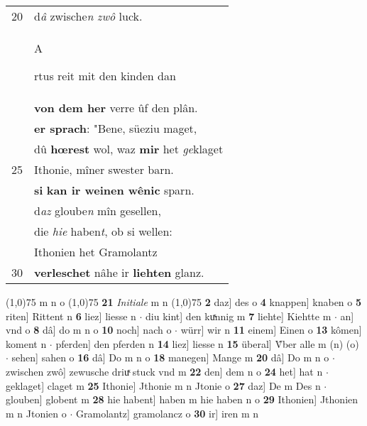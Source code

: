 \documentclass[8pt,a4paper,notitlepage]{article}
\begin{document}
\begin{table}[ht]
\begin{minipage}[t]{0.5\linewidth}
\begin{tabular}{rl}
20 & d\textit{â} zwische\textit{n} \textit{zwô} luck.\\ 
 & \begin{large}A\end{large}rtus reit mit den kinden dan\\ 
 & \textbf{von dem her} verre ûf den plân.\\ 
 & \textbf{er sprach}: "Bene, süeziu maget,\\ 
 & dû \textbf{hœrest} wol, waz \textbf{mir} het \textit{ge}klaget\\ 
25 & Ithonie, mîner swester barn.\\ 
 & \textbf{si} \textbf{kan ir weinen wênic} sparn.\\ 
 & d\textit{az} gloube\textit{n} mîn gesellen,\\ 
 & die \textit{hie} haben\textit{t}, ob si wellen:\\ 
 & Ithonien het Gramolantz\\ 
30 & \textbf{verleschet} nâhe ir \textbf{liehten} glanz.\\ 
\end{tabular}
\scriptsize
\line(1,0){75} \newline
m n o \newline
\line(1,0){75} \newline
\textbf{21} \textit{Initiale} m n  \newline
\line(1,0){75} \newline
\textbf{2} daz] des o \textbf{4} knappen] knaben o \textbf{5} riten] Rittent n \textbf{6} liez] liesse n  $\cdot$ diu kint] den kuͯnnig m \textbf{7} liehte] Kiehtte m  $\cdot$ an] vnd o \textbf{8} dâ] do m n o \textbf{10} noch] nach o  $\cdot$ würr] wir n \textbf{11} einem] Einen o \textbf{13} kômen] koment n  $\cdot$ pferden] den pferden n \textbf{14} liez] liesse n \textbf{15} überal] V̂ber alle m (n) (o)  $\cdot$ sehen] sahen o \textbf{16} dâ] Do m n o \textbf{18} manegen] Mange m \textbf{20} dâ] Do m n o  $\cdot$ zwischen zwô] zewusche driuͯ stuck vnd m \textbf{22} den] dem n o \textbf{24} het] hat n  $\cdot$ geklaget] claget m \textbf{25} Ithonie] Jthonie m n Jtonie o \textbf{27} daz] De m Des n  $\cdot$ glouben] globent m \textbf{28} hie habent] haben m hie haben n o \textbf{29} Ithonien] Jthonien m n Jtonien o  $\cdot$ Gramolantz] gramolancz o \textbf{30} ir] iren m n \newline
\end{minipage}
\end{table}
\newpage
\end{document}
